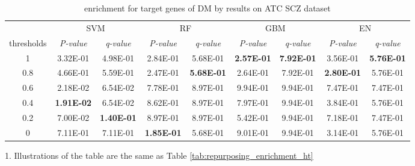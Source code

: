         \begin{table}[htbp]
          \centering
          \caption{enrichment for target genes of DM by results on ATC SCZ dataset}
          \begin{threeparttable}
            \tabcolsep=0.10cm
            \begin{tabular}{ccccccccc}
            \toprule
                  & \multicolumn{2}{c}{SVM} & \multicolumn{2}{c}{RF} & \multicolumn{2}{c}{GBM} & \multicolumn{2}{c}{EN} \\
            thresholds & \textit{P-value} & \textit{q-value} & \textit{P-value} & \textit{q-value} & \textit{P-value} & \textit{q-value} & \textit{P-value} & \textit{q-value} \\
            \midrule
            1     & 3.32E-01 & 4.98E-01 & 2.84E-01 & 5.68E-01 & \textbf{2.57E-01} & \textbf{7.92E-01} & 3.56E-01 & \textbf{5.76E-01} \\
            0.8   & 4.66E-01 & 5.59E-01 & 2.47E-01 & \textbf{5.68E-01} & 2.64E-01 & 7.92E-01 & \textbf{2.80E-01} & 5.76E-01 \\
            0.6   & 2.18E-02 & 6.54E-02 & 7.78E-01 & 8.97E-01 & 9.94E-01 & 9.94E-01 & 7.47E-01 & 7.47E-01 \\
            0.4   & \textbf{1.91E-02} & 6.54E-02 & 8.62E-01 & 8.97E-01 & 7.97E-01 & 9.94E-01 & 3.84E-01 & 5.76E-01 \\
            0.2   & 7.00E-02 & \textbf{1.40E-01} & 8.97E-01 & 8.97E-01 & 5.42E-01 & 9.94E-01 & 7.18E-01 & 7.47E-01 \\
            0     & 7.11E-01 & 7.11E-01 & \textbf{1.85E-01} & 5.68E-01 & 9.01E-01 & 9.94E-01 & 3.14E-01 & 5.76E-01 \\
            \bottomrule
            \end{tabular}%
            \begin{tablenotes}
              \item 1. Illustrations of the table are the same as Table \ref{tab:repurposing_enrichment_ht}
            \end{tablenotes}
          \end{threeparttable}
          \label{tab:repurposing_enrichment_scz}%
        \end{table}%


